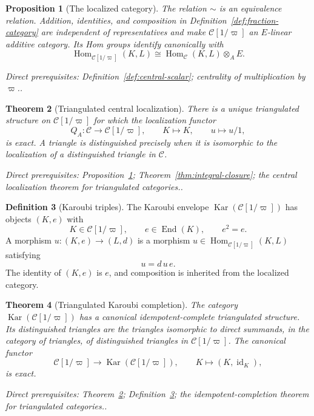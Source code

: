 \documentclass[10pt]{article}
\newtheorem{theorem}{Theorem}[section]
\newtheorem{proposition}[theorem]{Proposition}
\theoremstyle{definition}
\newtheorem{definition}[theorem]{Definition}
\newcommand{\Hom}{\operatorname{Hom}}
\newcommand{\Kar}{\operatorname{Kar}}
\newcommand{\depends}[1]{\par\smallskip\noindent\textit{Direct prerequisites:} #1.}
\begin{document}
\begin{proposition}[The localized category]\label{prop:fraction-category}
The relation $\sim$ is an equivalence relation.  Addition, identities, and
composition in Definition~\ref{def:fraction-category} are independent of
representatives and make $\mathcal C[1/\varpi]$ an $E$-linear additive
category.  Its Hom groups identify canonically with
\[
 \Hom_{\mathcal C[1/\varpi]}(K,L)
 \cong\Hom_{\mathcal C}(K,L)\otimes_AE.
\]
\depends{Definition~\ref{def:central-scalar}; centrality of multiplication
by $\varpi$.}
\end{proposition}

\begin{theorem}[Triangulated central localization]
\label{thm:triangulated-localization}
There is a unique triangulated structure on $\mathcal C[1/\varpi]$ for which
the localization functor
\[
 Q_A:\mathcal C\longrightarrow\mathcal C[1/\varpi],
 \qquad K\longmapsto K,\qquad u\longmapsto u/1,
\]
is exact.  A triangle is distinguished precisely when it is isomorphic to
the localization of a distinguished triangle in $\mathcal C$.
\depends{Proposition~\ref{prop:fraction-category};
Theorem~\ref{thm:integral-closure}; the central localization theorem for
triangulated categories.}
\end{theorem}

\begin{definition}[Karoubi triples]\label{def:karoubi}
The Karoubi envelope $\Kar(\mathcal C[1/\varpi])$ has objects $(K,e)$ with
\[
 K\in\mathcal C[1/\varpi],\qquad
 e\in\operatorname{End}(K),\qquad e^2=e.
\]
A morphism $u:(K,e)\to(L,d)$ is a morphism
$u\in\Hom_{\mathcal C[1/\varpi]}(K,L)$ satisfying
\[
 u=d\,u\,e.
\]
The identity of $(K,e)$ is $e$, and composition is inherited from the
localized category.
\end{definition}

\begin{theorem}[Triangulated Karoubi completion]\label{thm:karoubi-triangulated}
The category $\Kar(\mathcal C[1/\varpi])$ has a canonical
idempotent-complete triangulated structure.  Its distinguished triangles
are the triangles isomorphic to direct summands, in the category of
triangles, of distinguished triangles in $\mathcal C[1/\varpi]$.  The
canonical functor
\[
 \mathcal C[1/\varpi]\longrightarrow\Kar(\mathcal C[1/\varpi]),
 \qquad K\longmapsto(K,\operatorname{id}_K),
\]
is exact.
\depends{Theorem~\ref{thm:triangulated-localization};
Definition~\ref{def:karoubi}; the idempotent-completion theorem for
triangulated categories.}
\end{theorem}
\end{document}
